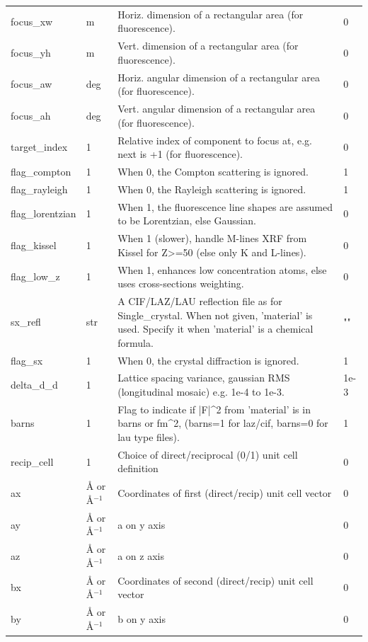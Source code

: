 \begin{longtable}{p{}p{}p{}p{}}
focus\_xw & m & Horiz. dimension of a rectangular area (for fluorescence). & 0 \\
focus\_yh & m & Vert.  dimension of a rectangular area (for fluorescence). & 0 \\
focus\_aw & deg & Horiz. angular dimension of a rectangular area (for fluorescence). & 0 \\
focus\_ah & deg & Vert.  angular dimension of a rectangular area (for fluorescence). & 0 \\
target\_index & 1 & Relative index of component to focus at, e.g. next is +1 (for fluorescence). & 0 \\
flag\_compton & 1 & When 0, the Compton  scattering is ignored. & 1 \\
flag\_rayleigh & 1 & When 0, the Rayleigh scattering is ignored. & 1 \\
flag\_lorentzian & 1 & When 1, the fluorescence line shapes are assumed to be Lorentzian, else Gaussian. & 0 \\
flag\_kissel & 1 & When 1 (slower), handle M-lines XRF from Kissel for Z\textgreater{}=50 (else only K and L-lines). & 0 \\
flag\_low\_z & 1 & When 1, enhances low concentration atoms, else uses cross-sections weighting. & 0 \\
sx\_refl & str & A CIF/LAZ/LAU reflection file as for Single\_crystal. When not given, 'material' is used. Specify it when 'material' is a chemical formula. & "" \\
flag\_sx & 1 & When 0, the crystal diffraction is ignored. & 1 \\
delta\_d\_d & 1 & Lattice spacing variance, gaussian RMS (longitudinal mosaic) e.g. 1e-4 to 1e-3. & 1e-3 \\
barns & 1 & Flag to indicate if |F|\textasciicircum{}2 from 'material' is in barns or fm\textasciicircum{}2, (barns=1 for laz/cif, barns=0 for lau type files). & 1 \\
recip\_cell & 1 & Choice of direct/reciprocal (0/1) unit cell definition & 0 \\
ax & \AA{} or \AA{}$^{-1}$ & Coordinates of first (direct/recip) unit cell vector & 0 \\
ay & \AA{} or \AA{}$^{-1}$ & a on y axis & 0 \\
az & \AA{} or \AA{}$^{-1}$ & a on z axis & 0 \\
bx & \AA{} or \AA{}$^{-1}$ & Coordinates of second (direct/recip) unit cell vector & 0 \\
by & \AA{} or \AA{}$^{-1}$ & b on y axis & 0 \\

\end{longtable}
